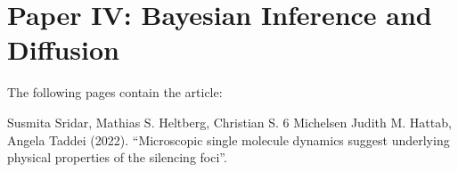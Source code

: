 
\chapter{Paper IV: Bayesian Inference and Diffusion}


The following pages contain the article:
\vspace*{1cm}


Susmita Sridar, Mathias S. Heltberg, Christian S. 6 Michelsen Judith M. Hattab, Angela Taddei (2022). ``Microscopic single molecule dynamics suggest underlying physical properties of the silencing foci''.

\clearpage
